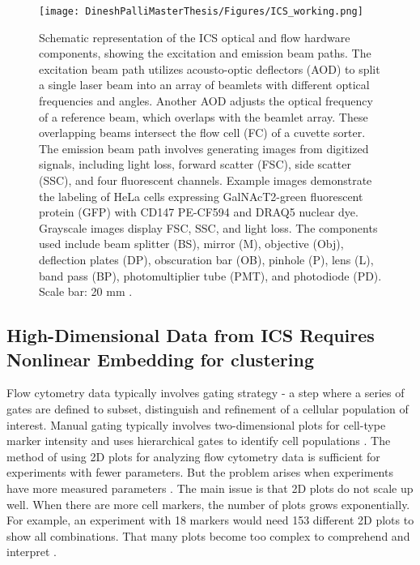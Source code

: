 \documentclass[12pt,a4paper]{article}
\begin{document}
\begin{figure}
  \centering
  \texttt{[image: DineshPalliMasterThesis/Figures/ICS\_working.png]}
  \caption[Representation of Image-based Cell Sorter]{Schematic representation of the ICS optical and flow hardware components, showing the excitation and emission beam paths. The excitation beam path utilizes acousto-optic deflectors (AOD) to split a single laser beam into an array of beamlets with different optical frequencies and angles. Another AOD adjusts the optical frequency of a reference beam, which overlaps with the beamlet array. These overlapping beams intersect the flow cell (FC) of a cuvette sorter. The emission beam path involves generating images from digitized signals, including light loss, forward scatter (FSC), side scatter (SSC), and four fluorescent channels. Example images demonstrate the labeling of HeLa cells expressing GalNAcT2-green fluorescent protein (GFP) with CD147 PE-CF594 and DRAQ5 nuclear dye. Grayscale images display FSC, SSC, and light loss. The components used include beam splitter (BS), mirror (M), objective (Obj), deflection plates (DP), obscuration bar (OB), pinhole (P), lens (L), band pass (BP), photomultiplier tube (PMT), and photodiode (PD). Scale bar: 20 mm \cite{doi:10.1126/science.abj3013}.}
  \label{icsworking}
\end{figure}



\subsection{High-Dimensional Data from ICS Requires Nonlinear Embedding for clustering} %
Flow cytometry data typically involves gating strategy - a step where a series of gates are defined to subset, distinguish and refinement of a cellular population of interest. Manual gating typically involves two-dimensional plots for cell-type marker intensity and uses hierarchical gates to identify cell populations \cite{10.3389/fimmu.2021.787574}. The method of using 2D plots for analyzing flow cytometry data is sufficient for experiments with fewer parameters. But the problem arises when experiments have more measured parameters \cite{mair_hartmann_mrdjen_tosevski_krieg_becher_2016}. The main issue is that 2D plots do not scale up well. When there are more cell markers, the number of plots grows exponentially. For example, an experiment with 18 markers would need 153 different 2D plots to show all combinations. That many plots become too complex to comprehend and interpret \cite{mair_hartmann_mrdjen_tosevski_krieg_becher_2016}.
\end{document}
